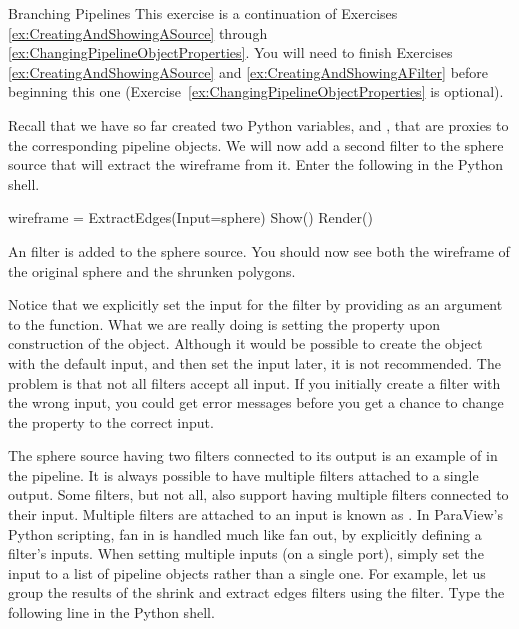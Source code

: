 \begin{exercise}{Branching Pipelines}
  \label{ex:BranchingPipelines}%
  This exercise is a continuation of Exercises
  \ref{ex:CreatingAndShowingASource} through
  \ref{ex:ChangingPipelineObjectProperties}.  You will need to finish
  Exercises \ref{ex:CreatingAndShowingASource} and
  \ref{ex:CreatingAndShowingAFilter} before beginning this one
  (Exercise~\ref{ex:ChangingPipelineObjectProperties} is optional).

  Recall that we have so far created two Python variables, 
  and , that are proxies to the corresponding pipeline
  objects.  We will now add a second filter to the sphere source that will
  extract the wireframe from it.  Enter the following in the Python shell.

  \begin{python}
wireframe = ExtractEdges(Input=sphere)
Show()
Render()
  \end{python}

  An  filter is added to the sphere source.  You should
  now see both the wireframe of the original sphere and the shrunken
  polygons.

  Notice that we explicitly set the input for the 
  filter by providing  as an argument to the
   function.  What we are really doing is setting the
   property upon construction of the object.  Although it
  would be possible to create the object with the default input, and then
  set the input later, it is not recommended.  The problem is that not all
  filters accept all input.  If you initially create a filter with the
  wrong input, you could get error messages before you get a chance to
  change the  property to the correct input.

  The sphere source having two filters connected to its output is an
  example of  in the pipeline.  It is always possible to
  have multiple filters attached to a single output.  Some filters, but not
  all, also support having multiple filters connected to their input.
  Multiple filters are attached to an input is known as .
  In ParaView's Python scripting, fan in is handled much like fan out, by
  explicitly defining a filter's inputs.  When setting multiple inputs (on
  a single port), simply set the input to a list of pipeline objects rather
  than a single one.  For example, let us group the results of the shrink
  and extract edges filters using the  filter.  Type
  the following line in the Python shell.


\end{exercise}
